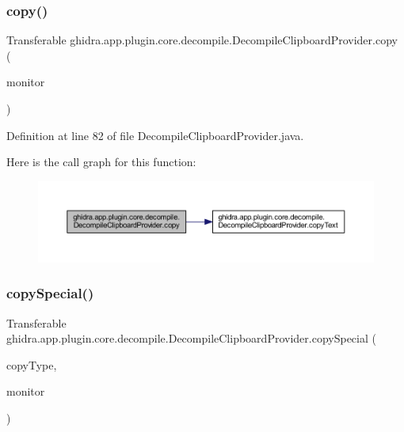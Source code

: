 \subsubsection{\texorpdfstring{copy()}{copy()}}
{\footnotesize\ttfamily Transferable ghidra.\+app.\+plugin.\+core.\+decompile.\+Decompile\+Clipboard\+Provider.\+copy (\begin{DoxyParamCaption}\item[{Task\+Monitor}]{monitor }\end{DoxyParamCaption})\hspace{0.3cm}{\ttfamily [inline]}}



Definition at line 82 of file Decompile\+Clipboard\+Provider.\+java.

Here is the call graph for this function\+:
\nopagebreak
\begin{figure}[H]
\begin{center}
\leavevmode
\includegraphics[width=350pt]{classghidra_1_1app_1_1plugin_1_1core_1_1decompile_1_1_decompile_clipboard_provider_ab7bc9b222a51e9d926ff7e289b8bc0f4_cgraph}
\end{center}
\end{figure}
\mbox{\label{classghidra_1_1app_1_1plugin_1_1core_1_1decompile_1_1_decompile_clipboard_provider_a508c7b98f33673f883e47ba7c3ba60cf}} 
\subsubsection{\texorpdfstring{copySpecial()}{copySpecial()}}
{\footnotesize\ttfamily Transferable ghidra.\+app.\+plugin.\+core.\+decompile.\+Decompile\+Clipboard\+Provider.\+copy\+Special (\begin{DoxyParamCaption}\item[{Clipboard\+Type}]{copy\+Type,  }\item[{Task\+Monitor}]{monitor }\end{DoxyParamCaption})\hspace{0.3cm}{\ttfamily [inline]}}



